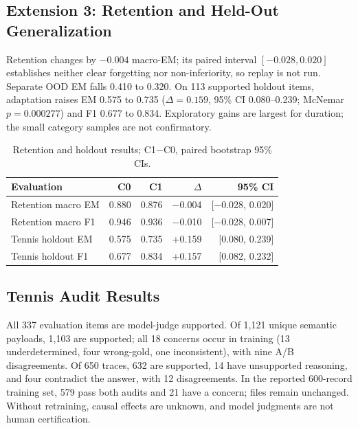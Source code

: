 \documentclass[conference]{IEEEtran}
\begin{document}
\subsection{Extension 3: Retention and Held-Out Generalization}

Retention changes by $-0.004$ macro-EM; its paired interval $[-0.028,0.020]$ establishes neither clear forgetting nor non-inferiority, so replay is not run. Separate OOD EM falls 0.410 to 0.320. On 113 supported holdout items, adaptation raises EM 0.575 to 0.735 ($\Delta=0.159$, 95\% CI 0.080--0.239; McNemar $p=0.000277$) and F1 0.677 to 0.834. Exploratory gains are largest for duration; the small category samples are not confirmatory.

\begin{table}[t]
\centering
\caption{Retention and holdout results; C1$-$C0, paired bootstrap 95\% CIs.}
\label{tab:retention-final}
\setlength{\tabcolsep}{2.8pt}
{\footnotesize
\begin{tabular}{lrrrr}
\toprule
\textbf{Evaluation} & \textbf{C0} & \textbf{C1} & \textbf{$\Delta$} & \textbf{95\% CI} \\
\midrule
Retention macro EM & 0.880 & 0.876 & $-$0.004 & [$-$0.028, 0.020] \\
Retention macro F1 & 0.946 & 0.936 & $-$0.010 & [$-$0.028, 0.007] \\
\rowcolor{gray!18}
Tennis holdout EM & 0.575 & 0.735 & +0.159 & [0.080, 0.239] \\
\rowcolor{gray!18}
Tennis holdout F1 & 0.677 & 0.834 & +0.157 & [0.082, 0.232] \\
\bottomrule
\end{tabular}
}
\end{table}

\subsection{Tennis Audit Results}

All 337 evaluation items are model-judge supported. Of 1,121 unique semantic payloads, 1,103 are supported; all 18 concerns occur in training (13 underdetermined, four wrong-gold, one inconsistent), with nine A/B disagreements. Of 650 traces, 632 are supported, 14 have unsupported reasoning, and four contradict the answer, with 12 disagreements. In the reported 600-record training set, 579 pass both audits and 21 have a concern; files remain unchanged. Without retraining, causal effects are unknown, and model judgments are not human certification.
\end{document}

